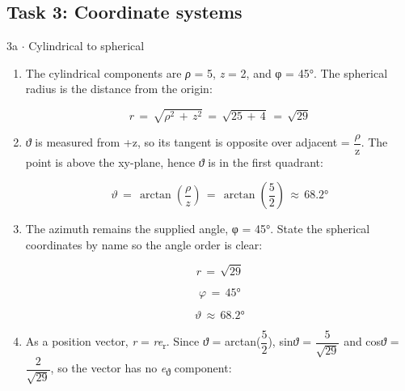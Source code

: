 \documentclass[11pt]{article}
\begin{document}
\begin{keepsection}\subsection{Task 3: Coordinate systems}

\begin{workedbox}{3a \ensuremath{\cdot} Cylindrical to spherical}
\begin{enumerate}
\item {}
The cylindrical components are \textit{ρ} = 5, \textit{z} = 2, and φ = 45°. The spherical radius is the distance from the origin:

\begin{equation*}{r}\, =\, \sqrt{{ρ}^{2}\, +\, {z}^{2}}\, =\, \sqrt{25\, +\, 4}\, =\, \sqrt{29}\end{equation*}
\item {}
\textit{ϑ} is measured from +z, so its tangent is opposite over adjacent = {\small\ensuremath{\dfrac{ρ}{\mathrm{z}}}}. The point is above the xy-plane, hence \textit{ϑ} is in the first quadrant:

\begin{equation*}{ϑ}\, =\, \arctan \left(\dfrac{{ρ}}{{z}}\right)\, =\, \arctan \left(\dfrac{5}{2}\right)\, \approx \, 68.2°\end{equation*}
\item {}
The azimuth remains the supplied angle, φ = 45°. State the spherical coordinates by name so the angle order is clear:

\begin{equation*}{r}\, =\, \sqrt{29}\end{equation*}

\begin{equation*}{φ}\, =\, 45°\end{equation*}

\begin{equation*}{ϑ}\, \approx \, 68.2°\end{equation*}
\item {}
As a position vector, \textit{r} = \textit{r}\textit{e}\textsubscript{r}. Since \textit{ϑ} = arctan({\small\ensuremath{\dfrac{5}{2}}}), sin\textit{ϑ} = {\small\ensuremath{\dfrac{5}{\sqrt{29}}}} and cos\textit{ϑ} = {\small\ensuremath{\dfrac{2}{\sqrt{29}}}}, so the vector has no \textit{e}\textsubscript{ϑ} component:


\end{enumerate}
\end{workedbox}
\end{keepsection}
\end{document}
